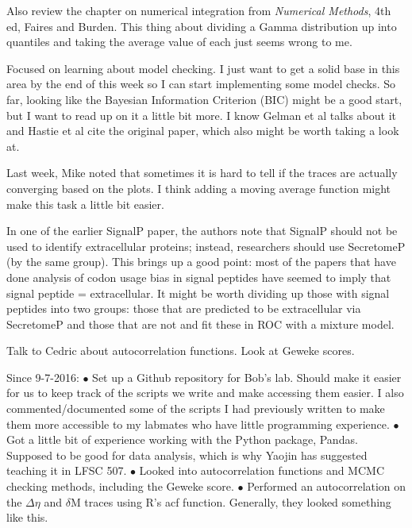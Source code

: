 \documentclass[11pt]{labbook}
\begin{document}
Also review the chapter on numerical integration from \textit{Numerical Methods}, 4th ed, Faires and Burden. This thing about dividing a Gamma distribution up into quantiles and taking the average value of each just seems wrong to me. 

Focused on learning about model checking. I just want to get a solid base in this area by the end of this week so I can start implementing some model checks. So far, looking like the Bayesian Information Criterion (BIC) might be a good start, but I want to read up on it a little bit more. I know Gelman et al talks about it and Hastie et al cite the original paper, which also might be worth taking a look at. 

Last week, Mike noted that sometimes it is hard to tell if the traces are actually converging based on the plots. I think adding a moving average function might make this task a little bit easier. 

In one of the earlier SignalP paper, the authors note that SignalP should not be used to identify extracellular proteins; instead, researchers should use SecretomeP (by the same group). This brings up a good point: most of the papers that have done analysis of codon usage bias in signal peptides have seemed to imply that signal peptide = extracellular. It might be worth dividing up those with signal peptides into two groups: those that are predicted to be extracellular via SecretomeP and those that are not and fit these in ROC with a mixture model. 

Talk to Cedric about autocorrelation functions. Look at Geweke scores. 


Since 9-7-2016:
$\bullet$ Set up a Github repository for Bob's lab. Should make it easier for us to keep track of the scripts we write and make accessing them easier. I also commented/documented some of the scripts I had previously written to make them more accessible to my labmates who have little programming experience. \newline
$\bullet$ Got a little bit of experience working with the Python package, Pandas. Supposed to be good for data analysis, which is why Yaojin has suggested teaching it in LFSC 507. \newline
$\bullet$ Looked into autocorrelation functions and MCMC checking methods, including the Geweke score. \newline
$\bullet$ Performed an autocorrelation on the $\Delta\eta$ and $\delta$M traces using R's acf function. Generally, they looked something like this.
\end{document}
